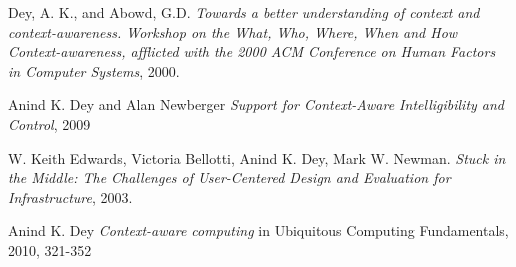 \documentclass[../report.tex]{subfiles}
\begin{document}
\graphicspath{{img/}{../img/}}
\begin{thebibliography}{9}

  Dey, A. K., and Abowd, G.D.
  \emph{Towards a better understanding of context and context-awareness. Workshop on the What, Who, Where, When and How Context-awareness, afflicted with the 2000 ACM Conference on Human Factors in Computer Systems},
  2000.
  
    Anind K. Dey and Alan Newberger
    \emph{Support for Context-Aware Intelligibility and Control}, 2009
  
  
  W. Keith Edwards, Victoria Bellotti, Anind K. Dey,
  Mark W. Newman.
  \emph{Stuck in the Middle: The Challenges of
  User-Centered Design and Evaluation for Infrastructure},
  2003.
  
    Anind K. Dey
    \emph{Context-aware computing} in Ubiquitous Computing Fundamentals, 2010, 321-352

\end{thebibliography}
\end{document}
